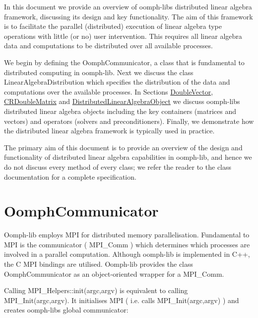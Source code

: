 In this document we provide an overview of {\ttfamily oomph-\/lib\textquotesingle{}s} distributed linear algebra framework, discussing its design and key functionality. The aim of this framework is to facilitate the parallel (distributed) execution of linear algebra type operations with little (or no) user intervention. This requires all linear algebra data and computations to be distributed over all available processes.

We begin by defining the {\ttfamily Oomph\+Communicator}, a class that is fundamental to distributed computing in {\ttfamily oomph-\/lib}. Next we discuss the class {\ttfamily Linear\+Algebra\+Distribution} which specifies the distribution of the data and computations over the available processes. In Sections \hyperlink{index_double_vector}{Double\+Vector}, \hyperlink{index_cr_double_matrix}{C\+R\+Double\+Matrix} and \hyperlink{index_distributed_linear_algebra_object}{Distributed\+Linear\+Algebra\+Object} we discuss {\ttfamily oomph-\/lib\textquotesingle{}s} distributed linear algebra objects including the key containers (matrices and vectors) and operators (solvers and preconditioners). Finally, we demonstrate how the distributed linear algebra framework is typically used in practice.

The primary aim of this document is to provide an overview of the design and functionality of distributed linear algebra capabilities in {\ttfamily oomph-\/lib}, and hence we do not discuss every method of every class; we refer the reader to the class documentation for a complete specification.\hypertarget{index_oomph_communicator}{}\section{Oomph\+Communicator}\label{index_oomph_communicator}
{\ttfamily Oomph-\/lib} employs M\+PI for distributed memory parallelisation. Fundamental to M\+PI is the communicator ( {\ttfamily M\+P\+I\+\_\+\+Comm} ) which determines which processes are involved in a parallel computation. Although {\ttfamily oomph-\/lib} is implemented in C++, the C M\+PI bindings are utilised. {\ttfamily Oomph-\/lib} provides the class {\ttfamily Oomph\+Communicator} as an object-\/oriented wrapper for a {\ttfamily M\+P\+I\+\_\+\+Comm}.

Calling {\ttfamily M\+P\+I\+\_\+\+Helpers\+::init(argc,argv)} is equivalent to calling {\ttfamily M\+P\+I\+\_\+\+Init(argc,argv)}. It initialises M\+PI ( i.\+e. calls {\ttfamily M\+P\+I\+\_\+\+Init(argc,argv)} ) and creates {\ttfamily oomph-\/lib\textquotesingle{}s} global communicator\+:

